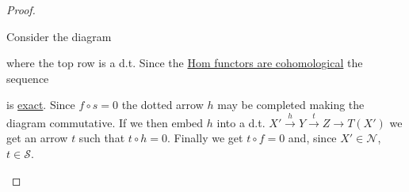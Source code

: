 \documentclass[../../main]{subfiles}
\begin{document}
\begin{proof}
\begin{enumerate}
          Consider the diagram
           \begin{center}
          \end{center}
          where the top row is a d.t.
          Since the \hyperref[prop:dt-and-hom]{Hom functors are cohomological} the sequence
          \begin{center}
          \end{center}
          is \hyperref[def:exact-sequence]{exact}.
          Since \(f \circ s = 0\) the dotted arrow \(h\) may be completed making the diagram commutative.
          If we then embed \(h\) into a d.t. \(X' \xrightarrow{h} Y \xrightarrow{t} Z \to T(X')\) we get an arrow \(t\) such that \(t \circ h = 0\).
          Finally we get \(t \circ f = 0\) and, since \(X' \in \mathcal{N}\), \(t \in \mathcal{S}\).
  \end{enumerate}
\end{proof}
\end{document}
